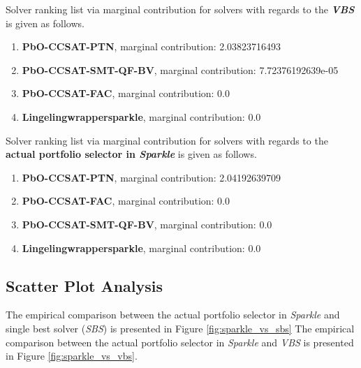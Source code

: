 \documentclass[british]{article}
\begin{document}
Solver ranking list via marginal contribution \cite{XuEtAl12} for solvers with regards to the \textbf{{\em VBS}} is given as follows.

\begin{enumerate} 
\item \textbf{PbO-CCSAT-PTN}, marginal contribution: 2.03823716493
\item \textbf{PbO-CCSAT-SMT-QF-BV}, marginal contribution: 7.72376192639e-05
\item \textbf{PbO-CCSAT-FAC}, marginal contribution: 0.0
\item \textbf{Lingeling\textunderscore wrapper\textunderscore sparkle}, marginal contribution: 0.0

\end{enumerate}

Solver ranking list via marginal contribution \cite{XuEtAl12} for solvers with regards to the \textbf{actual portfolio selector in \emph{Sparkle}} is given as follows.

\begin{enumerate} 
\item \textbf{PbO-CCSAT-PTN}, marginal contribution: 2.04192639709
\item \textbf{PbO-CCSAT-FAC}, marginal contribution: 0.0
\item \textbf{PbO-CCSAT-SMT-QF-BV}, marginal contribution: 0.0
\item \textbf{Lingeling\textunderscore wrapper\textunderscore sparkle}, marginal contribution: 0.0

\end{enumerate}


\subsection{Scatter Plot Analysis}

The empirical comparison between the actual portfolio selector in \emph{Sparkle} and single best solver (\emph{SBS}) is presented in Figure \ref{fig:sparkle_vs_sbs}
The empirical comparison between the actual portfolio selector in \emph{Sparkle} and \emph{VBS} is presented in Figure \ref{fig:sparkle_vs_vbs}.

\end{document}
